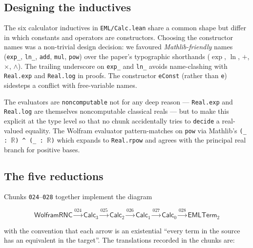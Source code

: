 \documentclass[11pt,a4paper]{article}
\theoremstyle{plain}
\theoremstyle{definition}
\newcommand{\R}{\mathbb{R}}
\begin{document}
\subsection{Designing the inductives}

The six calculator inductives in \texttt{EML/Calc.lean} share a common
shape but differ in which constants and operators are constructors.
Choosing the constructor names was a non-trivial design decision: we
favoured \emph{Mathlib-friendly} names (\texttt{exp\_}, \texttt{ln\_},
\texttt{add}, \texttt{mul}, \texttt{pow}) over the paper's typographic
shorthands ($\exp$, $\ln$, $+$, $\times$, $\wedge$).  The trailing
underscore on \texttt{exp\_} and \texttt{ln\_} avoids name-clashing with
\texttt{Real.exp} and \texttt{Real.log} in proofs.  The constructor
\texttt{eConst} (rather than \texttt{e}) sidesteps a conflict with
free-variable names.

The evaluators are \texttt{noncomputable} not for any deep reason ---
\texttt{Real.exp} and \texttt{Real.log} are themselves noncomputable
classical reals --- but to make this explicit at the type level so that
no chunk accidentally tries to \texttt{decide} a real-valued equality.
The Wolfram evaluator pattern-matches on \texttt{pow} via Mathlib's
\texttt{(\_ : $\R$) \^{} (\_ : $\R$)} which expands to
\texttt{Real.rpow} and agrees with the principal real branch for
positive bases.

\subsection{The five reductions}

Chunks \texttt{024}--\texttt{028} together implement the diagram

\[
\mathsf{WolframRNC} \xrightarrow{024} \mathsf{Calc}_3
\xrightarrow{025} \mathsf{Calc}_2 \xrightarrow{026} \mathsf{Calc}_1
\xrightarrow{027} \mathsf{Calc}_0 \xrightarrow{028} \mathsf{EMLTerm}_2
\]

with the convention that each arrow is an existential ``every term in
the source has an equivalent in the target''.  The translations
recorded in the chunks are:
\end{document}

